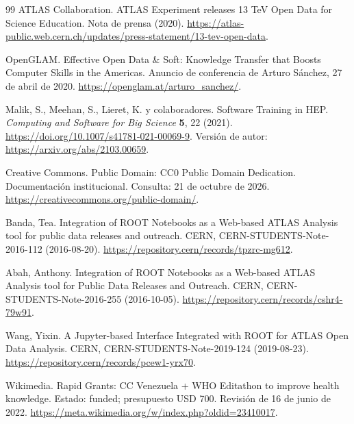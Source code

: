 \begin{thebibliography}{99}
 ATLAS Collaboration. ATLAS Experiment releases 13 TeV Open Data for Science Education. Nota de prensa (2020). \url{https://atlas-public.web.cern.ch/updates/press-statement/13-tev-open-data}.

 OpenGLAM. Effective Open Data \& Soft: Knowledge Transfer that Boosts Computer Skills in the Americas. Anuncio de conferencia de Arturo Sánchez, 27 de abril de 2020. \url{https://openglam.at/arturo_sanchez/}.

 Malik, S., Meehan, S., Lieret, K. y colaboradores. Software Training in HEP. \emph{Computing and Software for Big Science} \textbf{5}, 22 (2021). \url{https://doi.org/10.1007/s41781-021-00069-9}. Versión de autor: \url{https://arxiv.org/abs/2103.00659}.

 Creative Commons. Public Domain: CC0 Public Domain Dedication. Documentación institucional. Consulta: 21 de octubre de 2026. \url{https://creativecommons.org/public-domain/}.

 Banda, Tea. Integration of ROOT Notebooks as a Web-based ATLAS Analysis tool for public data releases and outreach. CERN, CERN-STUDENTS-Note-2016-112 (2016-08-20). \url{https://repository.cern/records/tpzrc-mg612}.

 Abah, Anthony. Integration of ROOT Notebooks as a Web-based ATLAS Analysis tool for Public Data Releases and Outreach. CERN, CERN-STUDENTS-Note-2016-255 (2016-10-05). \url{https://repository.cern/records/cshr4-79w91}.

 Wang, Yixin. A Jupyter-based Interface Integrated with ROOT for ATLAS Open Data Analysis. CERN, CERN-STUDENTS-Note-2019-124 (2019-08-23). \url{https://repository.cern/records/pcew1-yrx70}.

\enlargethispage{3\baselineskip}
 Wikimedia. Rapid Grants: CC Venezuela + WHO Editathon to improve health knowledge. Estado: funded; presupuesto USD 700. Revisión de 16 de junio de 2022. \url{https://meta.wikimedia.org/w/index.php?oldid=23410017}.
\end{thebibliography}
